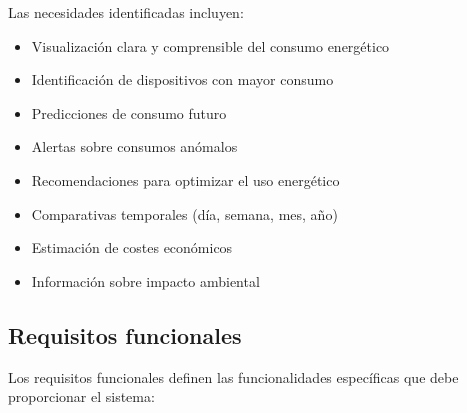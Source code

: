 Las necesidades identificadas incluyen:

\begin{itemize}
    \item Visualización clara y comprensible del consumo energético
    \item Identificación de dispositivos con mayor consumo
    \item Predicciones de consumo futuro
    \item Alertas sobre consumos anómalos
    \item Recomendaciones para optimizar el uso energético
    \item Comparativas temporales (día, semana, mes, año)
    \item Estimación de costes económicos
    \item Información sobre impacto ambiental
\end{itemize}

\subsection{Requisitos funcionales}

Los requisitos funcionales definen las funcionalidades específicas que debe proporcionar el sistema:

